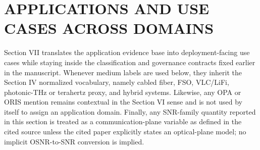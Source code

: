 \section{APPLICATIONS AND USE CASES ACROSS DOMAINS}

Section VII translates the application evidence base into deployment-facing use cases while staying inside the classification and governance contracts fixed earlier in the manuscript. Whenever medium labels are used below, they inherit the Section IV normalized vocabulary, namely cabled fiber, FSO, VLC/LiFi, photonic-THz or terahertz proxy, and hybrid systems. Likewise, any OPA or ORIS mention remains contextual in the Section VI sense and is not used by itself to assign an application domain. Finally, any SNR-family quantity reported in this section is treated as a communication-plane variable as defined in the cited source unless the cited paper explicitly states an optical-plane model; no implicit OSNR-to-SNR conversion is implied.

